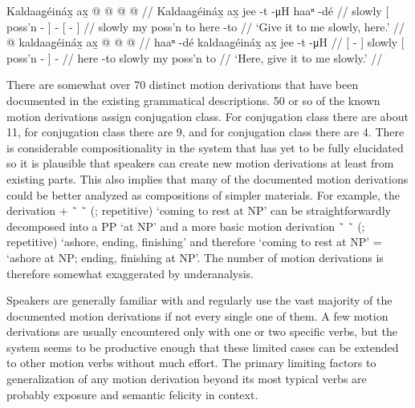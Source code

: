 \documentclass[12pt,letterpaper,oneside,article]{memoir}
\begin{document}
\pex\label{ex:motderiv-intro-zhither-adjunct}%
\a\label{ex:motderiv-intro-zhither-adjunct-right}%
%
\begingl
	\gla	Kaldaag̱éináx̱
		{} ax̱  @ {} {}
		 @ {} @ {}
		{}  @ {} {} //
	\glb	Kaldaag̱éináx̱
		{} ax̱ jee -t {}
		{}  -μH
		{} haaⁿ -dé {} //
	\glc	slowly
		{}[  poss’n - {}]
		\·  -
		{}[  - {}] //
	\gld	slowly
		{} my poss’n to {}
		 {} {}
		{} here -to {} //
	\glft	‘Give it to me slowly, here.’
		//
\endgl
\a\label{ex:motderiv-intro-zhither-adjunct-left}%
%
\begingl
	\gla	{}  @ {} {}
		kaldaag̱éináx̱
		{} ax̱  @ {} {}
		 @ {} @ {} //
	\glb	{} haaⁿ -dé {}
		kaldaag̱éináx̱
		{} ax̱ jee -t {}
		{}  -μH //
	\glc	{}[  - {}]
		slowly
		{}[  poss’n - {}]
		\·  - //
	\gld	{} here -to {}
		slowly
		{} my poss’n to {}
		 {} {} //
	\glft	‘Here, give it to me slowly.’
		//
\endgl
\xe

There are somewhat over 70 distinct motion derivations that have been documented in the existing grammatical descriptions.
50 or so of the known motion derivations assign  conjugation class.
For  conjugation class there are about 11, for  conjugation class there are 9, and for  conjugation class there are 4.
There is considerable compositionality in the system that has yet to be fully elucidated so it is plausible that speakers can create new motion derivations at least from existing parts.
This also implies that many of the documented motion derivations could be better analyzed as compositions of simpler materials.
For example, the derivation  +  \~\  \~\  (;  repetitive) ‘coming to rest at NP’ can be straightforwardly decomposed into a PP  ‘at NP’ and a more basic motion derivation  \~\  \~\  (;  repetitive) ‘ashore, ending, finishing’ and therefore ‘coming to rest at NP’ = ‘ashore at NP; ending, finishing at NP’.
The number of motion derivations is therefore somewhat exaggerated by underanalysis.

Speakers are generally familiar with and regularly use the vast majority of the documented motion derivations if not every single one of them.
A few motion derivations are usually encountered only with one or two specific verbs, but the system seems to be productive enough that these limited cases can be extended to other motion verbs without much effort.
The primary limiting factors to generalization of any motion derivation beyond its most typical verbs are probably exposure and semantic felicity in context.
\end{document}
